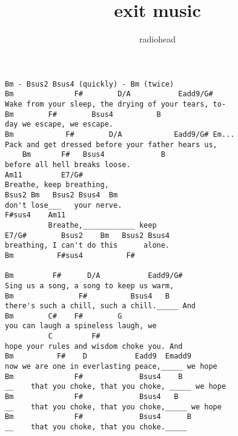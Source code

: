 \author{radiohead}
\title{exit music}
\maketitle
\begin{verbatim}
Bm - Bsus2 Bsus4 (quickly) - Bm (twice)
Bm              F#        D/A           Eadd9/G#
Wake from your sleep, the drying of your tears, to-
Bm        F#        Bsus4          B
day we escape, we escape.
Bm            F#        D/A            Eadd9/G# Em...
Pack and get dressed before your father hears us, 
    Bm       F#   Bsus4             B 
before all hell breaks loose.
Am11         E7/G#
Breathe, keep breathing,
Bsus2 Bm   Bsus2 Bsus4  Bm
don't lose___   your nerve.
F#sus4    Am11                 
          Breathe,____________ keep
E7/G#        Bsus2    Bm   Bsus2 Bsus4
breathing, I can't do this      alone.
Bm          F#sus4          F#

Bm         F#      D/A           Eadd9/G#
Sing us a song, a song to keep us warm,
Bm               F#          Bsus4   B
there's such a chill, such a chill._____ And
Bm        C#    F#        G
you can laugh a spineless laugh, we
          C         F#
hope your rules and wisdom choke you. And
Bm          F#    D           Eadd9  Emadd9
now we are one in everlasting peace,_____ we hope
Bm              F#             Bsus4    B
__    that you choke, that you choke, _____ we hope
Bm              F#             Bsus4   B
__    that you choke, that you choke,_____ we hope
Bm              F#             Bsus4      B
__    that you choke, that you choke._____
\end{verbatim}